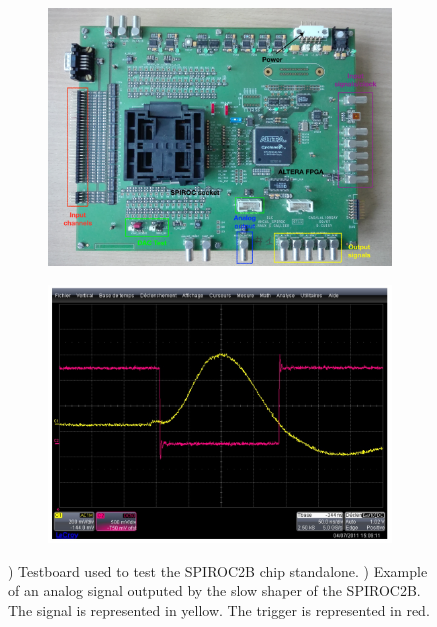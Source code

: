 \begin{figure}[htbp!]
  \centering
  \begin{subfigure}[t]{0.49\textwidth}
    \includegraphics[width=1.\linewidth]{chap4/fig_Commi/TestBoard.jpg}
    \caption{} \label{fig:Testboard_SP2B}
  \end{subfigure}
  \hfill
  \begin{subfigure}[t]{0.49\textwidth}
    \includegraphics[width=1.\linewidth]{chap4/fig_Commi/AnalogSignalSP2B.jpeg}
    \caption{} \label{fig:AnalogSignal_SP2B}
  \end{subfigure}
  \caption{) Testboard used to test the SPIROC2B chip standalone. ) Example of an analog signal outputed by the slow shaper of the SPIROC2B. The signal is represented in yellow. The trigger is represented in red.}
\end{figure}

